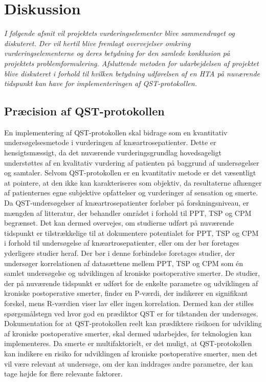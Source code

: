 \section{Diskussion}
\textit{I følgende afsnit vil projektets vurderingselementer blive sammendraget og diskuteret. Der vil hertil blive fremlagt overvejelser omkring vurderingselementerne og deres betydning for den samlede konklusion på projektets problemformulering. Afsluttende metoden for udarbejdelsen af projektet blive diskuteret i forhold til hvilken betydning udførelsen af en HTA på nuværende tidspunkt kan have for implementeringen af QST-protokollen.}

\subsection{Præcision af QST-protokollen} \label{Praecision} %
En implementering af QST-protokollen skal bidrage som en kvantitativ undersøgelsesmetode i vurderingen af knæartrosepatienter. Dette er hensigtsmæssigt, da det nuværende vurderingsgrundlag hovedsageligt understøttes af en kvalitativ vurdering af patienten på baggrund af undersøgelser og samtaler. Selvom QST-protokollen er en kvantitativ metode er det væsentligt at pointere, at den ikke kan karakteriseres som objektiv, da resultaterne afhænger af patienternes egne subjektive opfattelser og vurderinger af sensation og smerte.\\ 
Da QST-undersøgelser af knæartrosepatienter forløber på forskningsniveau, er mængden af litteratur, der behandler området i forhold til PPT, TSP og CPM begrænset. Det kan dermed overvejes, om studierne udført på nuværende tidspunkt er tilstrækkelige til at dokumentere potentialet for PPT, TSP og CPM i forhold til undersøgelse af knæartrosepatienter, eller om der bør foretages yderligere studier heraf. Der bør i denne forbindelse foretages studier, der undersøger korrelationen af datasættene mellem PPT, TSP og CPM som én samlet undersøgelse og udviklingen af kroniske postoperative smerter. De studier, der på nuværende tidspunkt er udført for de enkelte parametre og udviklingen af kroniske postoperative smerter, finder en P-værdi, der indikerer en signifikant forskel, mens R-værdien viser lav eller ingen korrelation. Dermed kan der stilles spørgsmålstegn ved hvor god en prædiktor QST er for tilstanden der undersøges. Dokumentation for at QST-protokollen reelt kan prædiktere risikoen for udvikling af kroniske postoperative smerter, skal dermed udarbejdes, før teknologien kan implementeres. Da smerte er multifaktorielt, er det muligt, at QST-protokollen kan indikere en risiko for udviklingen af kroniske postoperative smerter, men det vil være relevant at undersøge, om der kan inddrages andre parametre, der kan tage højde for flere relevante faktorer.\\

